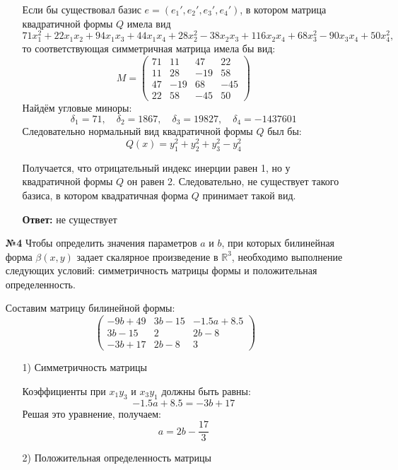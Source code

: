 \documentclass[a4paper]{article}
\newcommand{\mat}[1]{\begin{pmatrix} #1 \end{pmatrix}}
\begin{document}
\begin{enumerate}
\begin{enumerate}
        Если бы существовал базис \( e=(e_1',e_2',e_3',e_4') \), в котором матрица квадратичной формы \( Q \) имела вид
        \[
        71x_1^2+22x_1x_2+94x_1x_3+44x_1x_4+28x_2^2-38x_2x_3+116x_2x_4+68x_3^2-90x_3x_4+50x_4^2,
        \]
        то соответствующая симметричная матрица имела бы вид:
        \[
        M=\begin{pmatrix}
        71 & 11 & 47 & 22\\[1mm]
        11 & 28 & -19 & 58\\[1mm]
        47 & -19 & 68 & -45\\[1mm]
        22 & 58 & -45 & 50
        \end{pmatrix}
        \]
        Найдём угловые миноры:
        $$\delta_1 = 71, \quad \delta_2 = 1867,\quad \delta_3 = 19827, \quad \delta_4 = -1437601$$
        Следовательно нормальный вид квадратичной формы $Q$ был бы:
        $$Q(x) = y_1^2+y_2^2+y_3^2-y_4^2$$

        Получается, что отрицательный индекс инерции равен 1, но у квадратичной формы $Q$ он равен 2.
        Следовательно, не существует такого базиса, в котором квадратичная форма $Q$ принимает такой вид.

        \textbf{Ответ: } не существует\\

    \end{enumerate}

    \item[\textbf{№4}]
    Чтобы определить значения параметров \(a\) и \(b\), при которых билинейная форма \(\beta(x, y)\) задает скалярное произведение в \(\mathbb{R}^3\), необходимо выполнение следующих условий: симметричность матрицы формы и положительная определенность.
    
    Составим матрицу билинейной формы:
    $$\mat{
        -9b+49 & 3b-15 & -1.5a+8.5\\
        3b-15 & 2 & 2b-8\\
        -3b+17 & 2b-8 & 3
    }$$

    \begin{enumerate}
        \item[1)]Симметричность матрицы
        
        Коэффициенты при \(x_1 y_3\) и \(x_3 y_1\) должны быть равны:
        \[
        -1.5a + 8.5 = -3b + 17
        \]
        Решая это уравнение, получаем:
        \[
        a = 2b - \frac{17}{3}
        \]

        \item[2)]Положительная определенность матрицы
        

\end{enumerate}
\end{enumerate}
\end{document}
